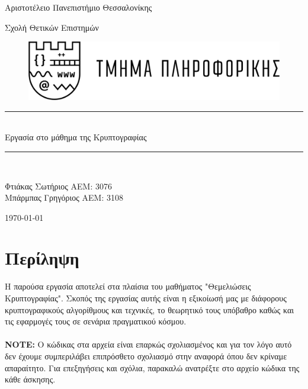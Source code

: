 \documentclass[12pt]{article}
\numberwithin{equation}{section}
\newcommand\blankpage{%
	\null
	\thispagestyle{empty}%
	\addtocounter{page}{-1}%
	\newpage}
\newcommand{\HRule}{\rule{\linewidth}{0.5mm}}
\newcommand{\lt}{\latintext}
\begin{document}
	\begin{titlepage}
		
		{\LARGE Αριστοτέλειο Πανεπιστήμιο Θεσσαλονίκης}
		\begin{center} {\Large Σχολή Θετικών Επιστημών} \end{center}
		\begin{figure}[h]
			\raggedright
			\hspace{90pt}
			\includegraphics[width=0.5\linewidth]{logo.png}
		\end{figure}
		\begin{center}
			
			
			\begin{figure}[h]
				\centering 
			\end{figure}
			\begin{center}
				
				\HRule \\[0.4cm]
				{\huge Εργασία στο μάθημα της Κρυπτογραφίας}
				
				\HRule \\[0.4cm]
			\end{center}
			
			\vfill
			\begin{doublespacing}
				
				{\LARGE 
					Φτιάκας Σωτήριος ΑΕΜ: 3076\\}
				{\LARGE 
					Μπάρμπας Γρηγόριος ΑΕΜ: 3108\\}
				
				
				\vfill 
				{\Large \today}
			\end{doublespacing}
		\end{center}
	\end{titlepage}
	
	
	\tableofcontents
	
	\clearpage
	
	
	\section*{{\color{maroon}Περίληψη}}
	Η παρούσα εργασία αποτελεί {\lt{project}} στα πλαίσια του μαθήματος "Θεμελιώσεις Κρυπτογραφίας". Σκοπός της εργασίας αυτής είναι η εξικοίωσή μας με διάφορους κρυπτογραφικούς αλγορίθμους και τεχνικές, το θεωρητικό τους υπόβαθρο καθώς και τις εφαρμογές τους σε σενάρια πραγματικού κόσμου.\\\\
	\textbf{NOTE:} Ο κώδικας στα αρχεία {\lt{.ipynb}} είναι επαρκώς σχολιασμένος και για τον λόγο αυτό δεν έχουμε συμπεριλάβει επιπρόσθετο σχολιασμό στην αναφορά όπου δεν κρίναμε απαραίτητο. Για επεξηγήσεις και σχόλια, παρακαλώ ανατρέξτε στο αρχείο κώδικα της κάθε άσκησης. 
	\blankpage
	
\end{document}
